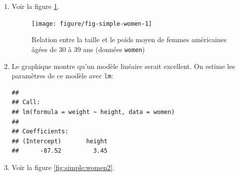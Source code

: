 \begin{solution}{2.3}
    \begin{enumerate}
    \item Voir la figure \ref{fig:simple:women}.
      \begin{figure}
\begin{knitrout}
\color{fgcolor}\begin{kframe}
\begin{alltt}
 \hlopt{~}     \hlstd{=} \hlstd{)}
\end{alltt}
\end{kframe}

{\centering \texttt{[image: figure/fig-simple-women-1]}

}



\end{knitrout}
        \caption{Relation entre la taille et le poids moyen de femmes américaines âgées de 30 à 39 ans (données \texttt{women})}
        \label{fig:simple:women}
      \end{figure}
    \item Le graphique montre qu'un modèle linéaire serait
      excellent. On estime les paramètres de ce modèle avec \texttt{lm}:
\begin{knitrout}
\color{fgcolor}\begin{kframe}
\begin{alltt}
 \hlkwb{<-}  \hlopt{~}   
\end{alltt}
\begin{verbatim}
##
## Call:
## lm(formula = weight ~ height, data = women)
##
## Coefficients:
## (Intercept)       height
##      -87.52         3.45
\end{verbatim}
\end{kframe}
\end{knitrout}
    \item Voir la figure \ref{fig:simple:women2}.
      \begin{figure}
\begin{knitrout}
\color{fgcolor}\begin{kframe}
\begin{alltt}
\end{alltt}
\end{kframe}
\end{knitrout}
\begin{knitrout}
\color{fgcolor}


\end{knitrout}
\end{figure}
\end{enumerate}
\end{solution}
